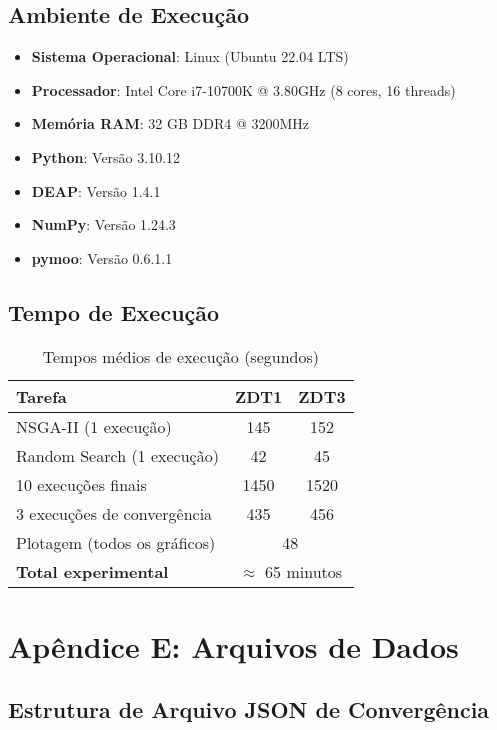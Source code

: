 \subsection{Ambiente de Execução}

\begin{itemize}
    \item \textbf{Sistema Operacional}: Linux (Ubuntu 22.04 LTS)
    \item \textbf{Processador}: Intel Core i7-10700K @ 3.80GHz (8 cores, 16 threads)
    \item \textbf{Memória RAM}: 32 GB DDR4 @ 3200MHz
    \item \textbf{Python}: Versão 3.10.12
    \item \textbf{DEAP}: Versão 1.4.1
    \item \textbf{NumPy}: Versão 1.24.3
    \item \textbf{pymoo}: Versão 0.6.1.1
\end{itemize}

\subsection{Tempo de Execução}

\begin{table}[H]
\centering
\caption{Tempos médios de execução (segundos)}
\begin{tabular}{@{}lcc@{}}
\toprule
\textbf{Tarefa} & \textbf{ZDT1} & \textbf{ZDT3} \\
\midrule
NSGA-II (1 execução) & 145 & 152 \\
Random Search (1 execução) & 42 & 45 \\
10 execuções finais & 1450 & 1520 \\
3 execuções de convergência & 435 & 456 \\
Plotagem (todos os gráficos) & \multicolumn{2}{c}{48} \\
\midrule
\textbf{Total experimental} & \multicolumn{2}{c}{$\approx$ 65 minutos} \\
\bottomrule
\end{tabular}
\end{table}

\section{Apêndice E: Arquivos de Dados}

\subsection{Estrutura de Arquivo JSON de Convergência}

